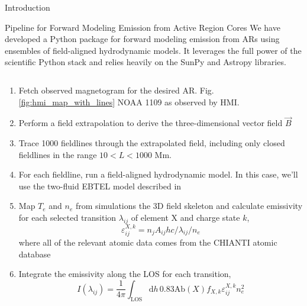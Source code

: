 \documentclass[final]{beamer}
\begin{document}
\begin{frame}
\begin{columns}[T]
\begin{column}{0.49\linewidth}
\begin{block}{Introduction}
\begin{itemize}
\begin{itemize}
      \end{itemize}
    \end{itemize}
    \end{block}
    \begin{block}{Pipeline for Forward Modeling Emission from Active Region Cores}
    We have developed a Python package for forward modeling emission from ARs using ensembles of field-aligned hydrodynamic models. It leverages the full power of the scientific Python stack and relies heavily on the SunPy \citep{sunpy_community_sunpypython_2015} and Astropy \citep{astropy_collaboration_astropy:_2013} libraries.
      \begin{columns}[T]
      \begin{column}{0.59\columnwidth}
        \begin{enumerate}
        \item Fetch observed magnetogram for the desired AR. Fig. \ref{fig:hmi_map_with_lines} NOAA 1109 as observed by HMI. 
        \item Perform a field extrapolation to derive the three-dimensional vector field $\vec{B}$
        \item Trace 1000 fieldlines through the extrapolated field, including only closed fieldlines in the range $10<L<1000$ Mm.
        \item For each fieldline, run a field-aligned hydrodynamic model. In this case, we'll use the two-fluid EBTEL model described in \citet{barnes_inference_2016}
        \item Map $T_e$ and $n_e$ from simulations the 3D field skeleton and calculate emissivity for each selected transition $\lambda_{ij}$ of element $\mathrm{X}$ and charge state $k$,
          \begin{equation*}
            \varepsilon_{ij}^{X,k} = n_jA_{ij}hc/\lambda_{ij}/n_e
          \end{equation*}
          where all of the relevant atomic data comes from the CHIANTI atomic database \citep{young_chianti_2016,dere_chianti_1997}
        \item Integrate the emissivity along the LOS for each transition,
          \begin{equation*}
            I(\lambda_{ij}) = \frac{1}{4\pi}\int_{\mathrm{LOS}}\mathrm{d}h\,0.83\mathrm{Ab}(X)f_{X,k}\varepsilon_{ij}^{X,k}n_e^2
          \end{equation*}
          \begin{itemize}

\end{itemize}
\end{enumerate}
\end{column}
\end{columns}
\end{block}
\end{column}
\end{columns}
\end{frame}
\end{document}
